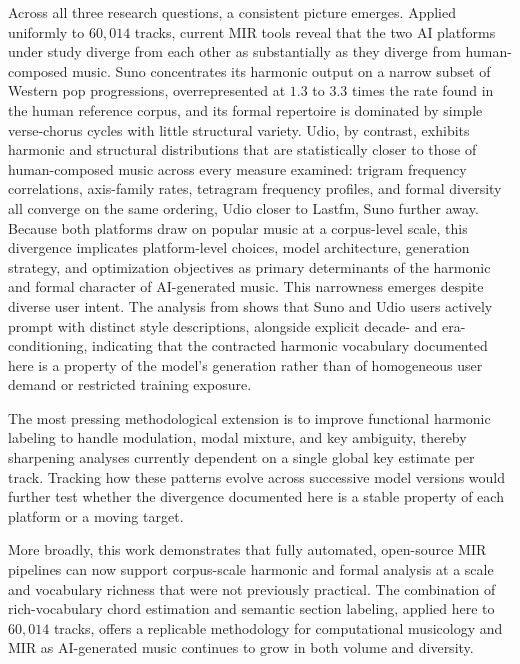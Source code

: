 \documentclass{article}
\newcommand{\rev}[1]{{\color{r2}#1}} %
\begin{document}
Across all three research questions, a consistent picture emerges. Applied uniformly to $60,014$ tracks, current MIR tools reveal that the two AI platforms under study diverge from each other as substantially as they diverge from human-composed music. Suno concentrates its harmonic output on a narrow subset of Western pop progressions, overrepresented at \rev{$1.3$ to $3.3$} times the rate found in the human reference corpus, and its formal repertoire is dominated by simple verse-chorus cycles with little structural variety. Udio, by contrast, exhibits harmonic and structural distributions that are statistically closer to those of human-composed music across every measure examined: trigram frequency correlations, axis-family rates, tetragram frequency profiles, and formal diversity all converge on the same ordering, Udio closer to Lastfm, Suno further away. Because both platforms draw on popular music at a corpus-level scale, this divergence implicates platform-level choices, model architecture, generation strategy, and optimization objectives as primary determinants of the harmonic and formal character of AI-generated music. This narrowness emerges despite diverse user intent. The analysis from \rev{\citet{casini2025data}} shows that Suno and Udio users actively prompt with distinct style descriptions, alongside explicit decade- and era-conditioning, indicating that the contracted harmonic vocabulary documented here is a property of the model's generation rather than of homogeneous user demand or restricted training exposure.

The most pressing methodological extension is to improve functional harmonic labeling to handle modulation, modal mixture, and key ambiguity, thereby sharpening analyses currently dependent on a single global key estimate per track. Tracking how these patterns evolve across successive model versions would further test whether the divergence documented here is a stable property of each platform or a moving target.

More broadly, this work demonstrates that fully automated, open-source MIR pipelines can now support corpus-scale harmonic and formal analysis at a scale and vocabulary richness that were not previously practical. The combination of rich-vocabulary chord estimation and semantic section labeling, applied here to $60,014$ tracks, offers a replicable methodology for computational musicology and MIR as AI-generated music continues to grow in both volume and diversity.

\end{document}
